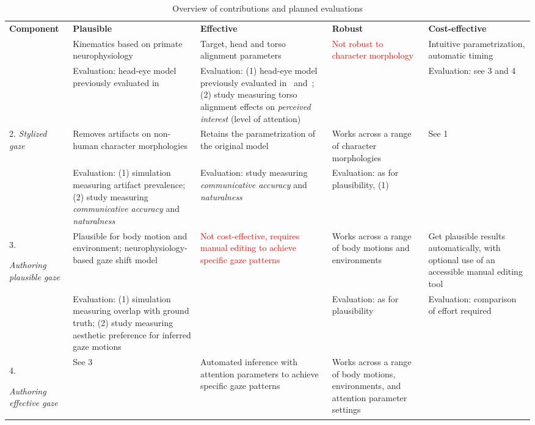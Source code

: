\bgroup
\def\arraystretch{1.5}
\begin{sidewaystable}
\caption{Overview of contributions and planned evaluations}
\label{tab:overview}
\tiny
\begin{tabularx}{\textwidth}{|p{2.7cm}||X|X|X|X|}
\hline
\textbf{Component} & \textbf{Plausible} & \textbf{Effective} & \textbf{Robust} & \textbf{Cost-effective} \\
\Xhline{2\arrayrulewidth}
\multirow{2}{*}{1. \emph{Gaze shift model}}
& Kinematics based on primate neurophysiology
& Target, head and torso alignment parameters
& \textcolor{red}{Not robust to character morphology}
& Intuitive parametrization, automatic timing \\
& Evaluation: head-eye model previously evaluated in~\citep{andrist2012headeye}
& Evaluation: (1) head-eye model previously evaluated in~\citep{andrist2012headeye} and~\citep{andrist2012designing}; (2) study measuring torso alignment effects on \emph{perceived interest} (level of attention)
& & Evaluation: see 3 and 4 \\
\hline
\multirow{2}{*}{2. \emph{Stylized gaze}}
& Removes artifacts on non-human character morphologies
& Retains the parametrization of the original model
& Works across a range of character morphologies
& See 1 \\
& Evaluation: (1) simulation measuring artifact prevalence; (2) study measuring \emph{communicative accuracy} and \emph{naturalness}
& Evaluation: study measuring \emph{communicative accuracy} and \emph{naturalness}
& Evaluation: as for plausibility, (1)
& \\
\hline
\multirow{2}{*}{3. \parbox{2.5cm}{\emph{Authoring plausible gaze}}}
& Plausible for body motion and environment; neurophysiology-based gaze shift model
& \textcolor{red}{Not cost-effective, requires manual editing to achieve specific gaze patterns}
& Works across a range of body motions and environments
& Get plausible results automatically, with optional use of an accessible manual editing tool \\
& Evaluation: (1) simulation measuring overlap with ground truth; (2) study measuring aesthetic preference for inferred gaze motions
& 
& Evaluation: as for plausibility
& Evaluation: comparison of effort required\\
\hline
\multirow{2}{*}{4. \parbox{2.5cm}{\emph{Authoring effective gaze}}}
& See 3
& Automated inference with attention parameters to achieve specific gaze patterns
& Works across a range of body motions, environments, and attention parameter settings

\end{tabularx}
\end{sidewaystable}
